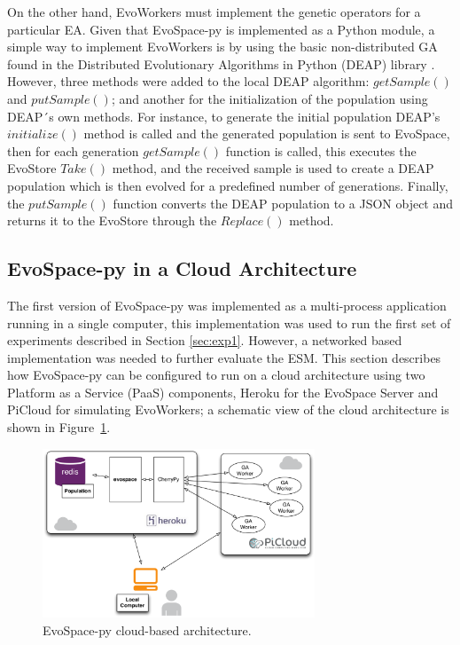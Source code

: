 On the other hand, EvoWorkers must implement the genetic operators for a particular EA.
Given that EvoSpace-py is implemented as a Python module, a simple way to implement EvoWorkers is by using the basic non-distributed GA found in the Distributed Evolutionary Algorithms in Python (DEAP) library \cite{DEAP_JMLR2012}. 
However, three methods were added to the local DEAP algorithm: $getSample()$ and  $putSample()$; and  another for the  initialization of the population using DEAP´s own methods.
For instance, to generate the initial population DEAP's $initialize()$ method  is called and the generated population is sent to EvoSpace, then for each generation $getSample()$ function is called, this executes the EvoStore $Take()$ method, and the received sample is used to create a DEAP population which is then evolved for a predefined number of generations.
Finally, the $putSample()$ function converts the DEAP population to a JSON object and returns it to the EvoStore through the $Replace()$ method.   

\subsection{EvoSpace-py in a Cloud Architecture}
The first version of EvoSpace-py was implemented as a multi-process application running in a single computer, this implementation was used to run the first set of experiments described in Section \ref{sec:exp1}.
However, a networked based implementation was needed to further evaluate the ESM.  
This section describes how EvoSpace-py can be configured to run on a cloud architecture using two Platform as a Service (PaaS) components, Heroku for the EvoSpace Server and PiCloud for simulating EvoWorkers; a schematic view of the cloud architecture is shown in Figure~\ref{herokuPiCloud}.

\begin{figure}[t]
\centering
\includegraphics[width=3.2in]{herokuPiCloud.eps}
\caption{EvoSpace-py cloud-based architecture.}
\label{herokuPiCloud}
\end{figure}

